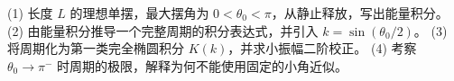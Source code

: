 (1) 长度 \(L\) 的理想单摆，最大摆角为 \(0<\theta_0<\pi\)，从静止释放，写出能量积分。
(2) 由能量积分推导一个完整周期的积分表达式，并引入 \(k=\sin(\theta_0/2)\)。
(3) 将周期化为第一类完全椭圆积分 \(K(k)\)，并求小振幅二阶校正。
(4) 考察 \(\theta_0\to\pi^-\) 时周期的极限，解释为何不能使用固定的小角近似。
